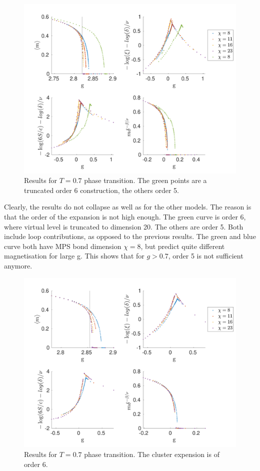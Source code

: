 \begin{figure}
    \center
    \includegraphics[width=\textwidth]{Figuren/phasediag/t07/full.pdf}
    \caption{Results for $T=0.7$ phase transition. The green points are a truncated order 6 construction, the others order 5.  }
    \label{fig:phase:t07:full}
\end{figure}

Clearly, the results do not collapse as well as for the other models. The reason is that the order of the expansion is not high enough. The green curve is order 6, where virtual level is truncated to dimension 20. The others are order 5. Both include loop contributions, as opposed to the previous results. The green and blue curve both have MPS bond dimension $\chi=8$, but predict quite different magnetisation for large g. This shows that for $g>0.7$, order 5 is not sufficient anymore.

\begin{figure}
    \center
    \includegraphics[width=\textwidth]{Figuren/phasediag/t07/zoomed2.pdf}
    \caption{Results for $T=0.7$ phase transition. The cluster expension is of order 6.}
    \label{fig:phase:t07:full2}
\end{figure}

